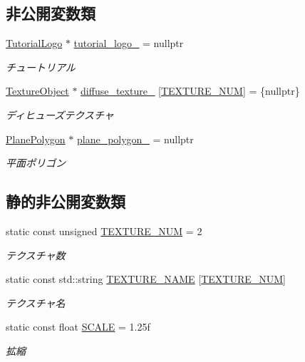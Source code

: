 \subsection*{非公開変数類}
\begin{DoxyCompactItemize}
\item 
\mbox{\hyperlink{class_tutorial_logo}{Tutorial\+Logo}} $\ast$ \mbox{\hyperlink{class_tutorial_logo_draw_ab357c25048d3582466a24234896adf3f}{tutorial\+\_\+logo\+\_\+}} = nullptr
\begin{DoxyCompactList}\small\item\em チュートリアル \end{DoxyCompactList}\item 
\mbox{\hyperlink{class_texture_object}{Texture\+Object}} $\ast$ \mbox{\hyperlink{class_tutorial_logo_draw_a7e846a5906f376d535e7c5e998103857}{diffuse\+\_\+texture\+\_\+}} \mbox{[}\mbox{\hyperlink{class_tutorial_logo_draw_aff3396323c386d499aa23e5605085ab1}{T\+E\+X\+T\+U\+R\+E\+\_\+\+N\+UM}}\mbox{]} = \{nullptr\}
\begin{DoxyCompactList}\small\item\em ディヒューズテクスチャ \end{DoxyCompactList}\item 
\mbox{\hyperlink{class_plane_polygon}{Plane\+Polygon}} $\ast$ \mbox{\hyperlink{class_tutorial_logo_draw_adc447c252db2d9ab17d72eb783d82432}{plane\+\_\+polygon\+\_\+}} = nullptr
\begin{DoxyCompactList}\small\item\em 平面ポリゴン \end{DoxyCompactList}\end{DoxyCompactItemize}
\subsection*{静的非公開変数類}
\begin{DoxyCompactItemize}
\item 
static const unsigned \mbox{\hyperlink{class_tutorial_logo_draw_aff3396323c386d499aa23e5605085ab1}{T\+E\+X\+T\+U\+R\+E\+\_\+\+N\+UM}} = 2
\begin{DoxyCompactList}\small\item\em テクスチャ数 \end{DoxyCompactList}\item 
static const std\+::string \mbox{\hyperlink{class_tutorial_logo_draw_a294d374ad4876c63f561f282f5eb6200}{T\+E\+X\+T\+U\+R\+E\+\_\+\+N\+A\+ME}} \mbox{[}\mbox{\hyperlink{class_tutorial_logo_draw_aff3396323c386d499aa23e5605085ab1}{T\+E\+X\+T\+U\+R\+E\+\_\+\+N\+UM}}\mbox{]}
\begin{DoxyCompactList}\small\item\em テクスチャ名 \end{DoxyCompactList}\item 
static const float \mbox{\hyperlink{class_tutorial_logo_draw_adb1a43e53dcacfc06835d8a1cc85e324}{S\+C\+A\+LE}} = 1.\+25f
\begin{DoxyCompactList}\small\item\em 拡縮 \end{DoxyCompactList}\end{DoxyCompactItemize}


